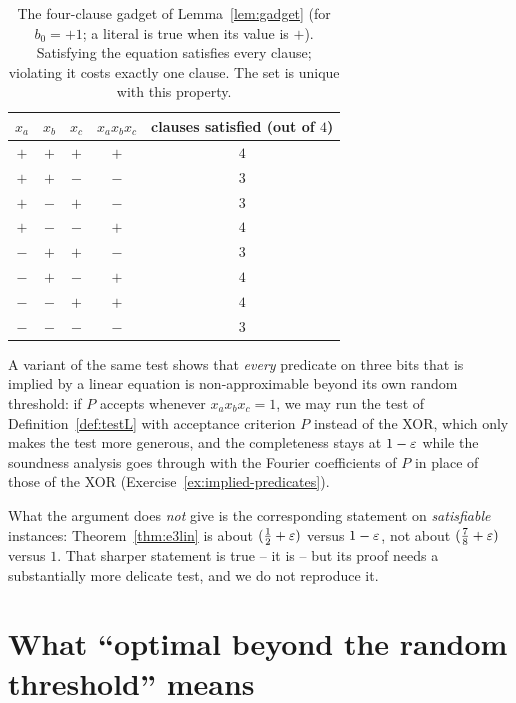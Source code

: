 \begin{table}[t]
\centering\small
\renewcommand{\arraystretch}{1.15}
\begin{tabular}{@{}ccc|cc@{}}
\toprule
$x_a$ & $x_b$ & $x_c$ & $x_ax_bx_c$ & clauses satisfied (out of $4$)\\
\midrule
$+$ & $+$ & $+$ & $+$ & $4$\\
$+$ & $+$ & $-$ & $-$ & $3$\\
$+$ & $-$ & $+$ & $-$ & $3$\\
$+$ & $-$ & $-$ & $+$ & $4$\\
$-$ & $+$ & $+$ & $-$ & $3$\\
$-$ & $+$ & $-$ & $+$ & $4$\\
$-$ & $-$ & $+$ & $+$ & $4$\\
$-$ & $-$ & $-$ & $-$ & $3$\\
\bottomrule
\end{tabular}
\caption{The four-clause gadget of Lemma~\ref{lem:gadget} (for $b_0=+1$; a literal is true when its value is $+$).  Satisfying the equation satisfies every clause; violating it costs exactly one clause.  The set is unique with this property.}
\label{tab:gadget}
\end{table}

\noindent
A variant of the same test \cite[Theorem~5.15]{Hastad01} shows that \emph{every} predicate on three bits that is implied by a linear equation is non-approximable beyond its own random threshold: if $P$ accepts whenever $x_ax_bx_c=1$, we may run the test of Definition~\ref{def:testL} with acceptance criterion $P$ instead of the XOR, which only makes the test more generous, and the completeness stays at $1-\varepsilon$ while the soundness analysis goes through with the Fourier coefficients of $P$ in place of those of the XOR (Exercise~\ref{ex:implied-predicates}).

What the argument does \emph{not} give is the corresponding statement on \emph{satisfiable} instances: Theorem~\ref{thm:e3lin} is about $(\tfrac12+\varepsilon)$ versus $1-\varepsilon$, not about $(\tfrac78+\varepsilon)$ versus $1$.  That sharper statement is true -- it is \cite[Theorem~6.5]{Hastad01} -- but its proof needs a substantially more delicate test, and we do not reproduce it.


\section{What ``optimal beyond the random threshold'' means}
\label{sec:optimal}

